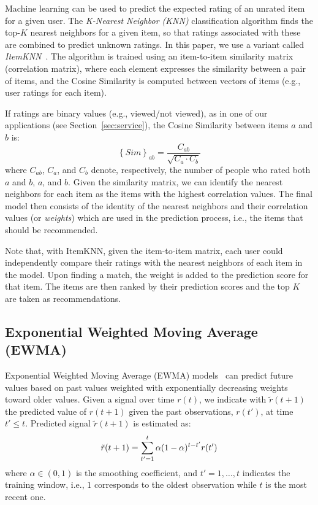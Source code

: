 \documentclass[conference]{IEEEtran}
\begin{document}
Machine learning can be used to predict the expected rating of an unrated item for a given user. The \emph{K-Nearest Neighbor (KNN)} classification algorithm finds the top-$K$ nearest neighbors for a given item, so that ratings associated with these are combined to predict unknown ratings.
In this paper, we use a variant called \emph{ItemKNN}~\cite{sarwar2001item}. The algorithm is trained using an item-to-item similarity matrix (correlation matrix), where each element expresses the similarity between a pair of items, and the Cosine Similarity is computed between vectors of items (e.g., user ratings for each item).

If ratings are binary values (e.g., viewed/not viewed), as in one of our applications (see Section~\ref{sec:service}), the Cosine Similarity between items $a$ and $b$ is:
\begin{equation}
\label{eq:sim}
\left\{ Sim \right\}_{ab} = \dfrac{C_{ab}}{\sqrt{C_a \cdot C_b}}
\end{equation}
where $C_{ab}$, $C_{a}$, and $C_{b}$ denote, respectively, the number of people who rated both $a$ and $b$,  $a$, and $b$.
Given the similarity matrix, we can identify the nearest neighbors for each item as the items with the highest correlation values. The final model then consists of the identity of the nearest neighbors and their correlation values (or \emph{weights}) which are used in the prediction process, i.e., the items that should be recommended. 

Note that, with ItemKNN, given the item-to-item matrix, each user could independently compare their ratings with the nearest neighbors of each item in the model. Upon finding a match, the weight is added to the prediction score for that item. The items are then ranked by their prediction scores and the top $K$ are taken as recommendations.



\subsection{Exponential Weighted Moving Average (EWMA)}
\label{sec:timePred}

Exponential Weighted Moving Average (EWMA) models~\cite{soldo2010predictive} can predict future values based on past values weighted with exponentially decreasing weights toward older values.
Given a signal over time $r(t)$, we indicate with $\tilde{r}(t + 1)$ the predicted value of $r(t + 1)$ given the past observations, $r(t')$, at time $t' \leq t$. 
Predicted signal $\tilde{r}(t + 1)$ is estimated as: \vspace{-0.15cm}
$$\tilde{r}(t + 1) = \sum\limits_{t'=1}^{t} \alpha (1-\alpha)^{t - t'} r(t') \vspace{-0.15cm}$$
where $\alpha \in (0, 1) $ is the smoothing coefficient, and $t' = 1, \dots, t$
indicates the training window, i.e., $1$ corresponds to the oldest observation while $t$ is the most recent one.
\end{document}
